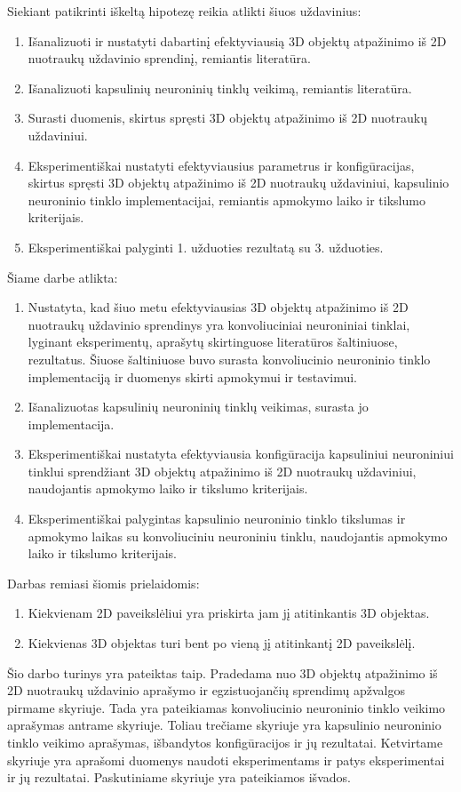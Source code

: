Siekiant patikrinti iškeltą hipotezę reikia atlikti šiuos uždavinius:

\begin{enumerate}
	\item Išanalizuoti ir nustatyti dabartinį efektyviausią 3D objektų atpažinimo iš 2D nuotraukų uždavinio sprendinį, remiantis literatūra.
	\item Išanalizuoti kapsulinių neuroninių tinklų veikimą, remiantis literatūra.
	\item Surasti duomenis, skirtus spręsti 3D objektų atpažinimo iš 2D nuotraukų uždaviniui.
	\item Eksperimentiškai nustatyti efektyviausius parametrus ir konfigūracijas, skirtus spręsti 3D objektų atpažinimo iš 2D nuotraukų uždaviniui, kapsulinio neuroninio tinklo implementacijai, remiantis apmokymo laiko ir tikslumo kriterijais.
	\item Eksperimentiškai palyginti 1. užduoties rezultatą su 3. užduoties.
\end{enumerate}

Šiame darbe atlikta:

\begin{enumerate}
	\item Nustatyta, kad šiuo metu efektyviausias 3D objektų atpažinimo iš 2D nuotraukų uždavinio sprendinys yra konvoliuciniai neuroniniai tinklai, lyginant eksperimentų, aprašytų skirtinguose literatūros šaltiniuose, rezultatus. Šiuose šaltiniuose buvo surasta konvoliucinio neuroninio tinklo implementaciją ir duomenys skirti apmokymui ir testavimui.
	\item Išanalizuotas kapsulinių neuroninių tinklų veikimas, surasta jo implementacija.
	\item Eksperimentiškai nustatyta efektyviausia konfigūracija kapsuliniui neuroniniui tinklui sprendžiant 3D objektų atpažinimo iš 2D nuotraukų uždaviniui, naudojantis apmokymo laiko ir tikslumo kriterijais.
	\item Eksperimentiškai palygintas kapsulinio neuroninio tinklo tikslumas ir apmokymo laikas su konvoliuciniu neuroniniu tinklu, naudojantis apmokymo laiko ir tikslumo kriterijais.
\end{enumerate}

Darbas remiasi šiomis prielaidomis:

\begin{enumerate}
	\item Kiekvienam 2D paveikslėliui yra priskirta jam jį atitinkantis 3D objektas.
	\item Kiekvienas 3D objektas turi bent po vieną jį atitinkantį 2D paveikslėlį.
\end{enumerate}

Šio darbo turinys yra pateiktas taip. Pradedama nuo 3D objektų atpažinimo iš 2D nuotraukų uždavinio aprašymo ir egzistuojančių sprendimų apžvalgos pirmame skyriuje. Tada yra pateikiamas konvoliucinio neuroninio tinklo veikimo aprašymas antrame skyriuje. Toliau trečiame skyriuje yra kapsulinio neuroninio tinklo veikimo aprašymas, išbandytos konfigūracijos ir jų rezultatai. Ketvirtame skyriuje yra aprašomi duomenys naudoti eksperimentams ir patys eksperimentai ir jų rezultatai. Paskutiniame skyriuje yra pateikiamos išvados.
